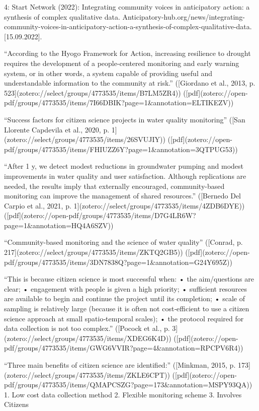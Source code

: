 {4: Start Network (2022): Integrating community voices in anticipatory action: a synthesis of complex qualitative data. Anticipatory-hub.org/news/integrating-community-voices-in-anticipatory-action-a-synthesis-of-complex-qualitative-data. [15.09.2022].

“According to the Hyogo Framework for Action, increasing resilience to drought requires the development of a people-centered monitoring and early warning system, or in other words, a system capable of providing useful and understandable information to the community at risk.” ([Giordano et al., 2013, p. 523](zotero://select/groups/4773535/items/B7LM5ZR4)) ([pdf](zotero://open-pdf/groups/4773535/items/7I66DBIK?page=1&annotation=ELTIKEZV))

“Success factors for citizen science projects in water quality monitoring” ([San Llorente Capdevila et al., 2020, p. 1](zotero://select/groups/4773535/items/26SVUJIY)) ([pdf](zotero://open-pdf/groups/4773535/items/FHIUZZ6Y?page=1&annotation=3QTPUG53))

“After 1 y, we detect modest reductions in groundwater pumping and modest improvements in water quality and user satisfaction. Although replications are needed, the results imply that externally encouraged, community-based monitoring can improve the management of shared resources.” ([Bernedo Del Carpio et al., 2021, p. 1](zotero://select/groups/4773535/items/4ZDB6DYE)) ([pdf](zotero://open-pdf/groups/4773535/items/D7G4LR6W?page=1&annotation=HQ4A6SZV))

“Community-based monitoring and the science of water quality” ([Conrad, p. 217](zotero://select/groups/4773535/items/ZKTQ2GB5)) ([pdf](zotero://open-pdf/groups/4773535/items/3DN7838Q?page=1&annotation=G24Y695Z))

“This is because citizen  science is most successful when:   
• the aim/questions are clear;  
• engagement with people is given a high priority;  
• sufficient resources are available to begin and continue the project until its completion;  
• scale of sampling is relatively large (because it is often not cost‐efficient to use a citizen  science approach at small spatio‐temporal scales);  
• the protocol required for data collection is not too complex.”
([Pocock et al., p. 3](zotero://select/groups/4773535/items/XDEG6K4D)) ([pdf](zotero://open-pdf/groups/4773535/items/GWG6VVIR?page=4&annotation=RPCPV6R4))

“Three main benefits of citizen science are identified:” ([Minkman, 2015, p. 173](zotero://select/groups/4773535/items/ZKLE6CPT)) ([pdf](zotero://open-pdf/groups/4773535/items/QMAPCSZG?page=173&annotation=MSPY93QA))
1. Low cost data collection method
2. Flexible monitoring scheme
3. Involves Citizens


}
